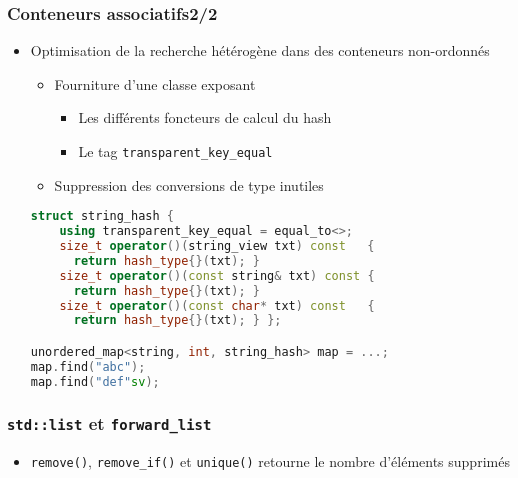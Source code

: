 \documentclass[C++.tex]{subfiles}
\begin{document}
\begin{frame}[fragile]
	\frametitle{Conteneurs associatifs\titlehfill{}2/2}
	\begin{itemize}
		\item Optimisation de la recherche hétérogène dans des conteneurs non-ordonnés
		\begin{itemize}
			\item Fourniture d'une classe exposant
			\begin{itemize}
				\item Les différents foncteurs de calcul du hash
				\item Le tag \lstinline|transparent_key_equal|
			\end{itemize}
			\item Suppression des conversions de type inutiles
		\end{itemize}

		\begin{lstlisting}[language=C++]
struct string_hash {
	using transparent_key_equal = equal_to<>;
	size_t operator()(string_view txt) const   { 
	  return hash_type{}(txt); }
	size_t operator()(const string& txt) const {
	  return hash_type{}(txt); }
	size_t operator()(const char* txt) const   {
	  return hash_type{}(txt); } };

unordered_map<string, int, string_hash> map = ...;
map.find("abc");
map.find("def"sv);\end{lstlisting}
	\end{itemize}
\end{frame}

\begin{frame}[fragile]
	\frametitle{\lstinline|std::list| et \lstinline|forward_list|}
	\begin{itemize}
		\item \lstinline|remove()|, \lstinline|remove_if()| et \lstinline|unique()| retourne le nombre d'éléments supprimés
	\end{itemize}
\end{frame}
\end{document}
